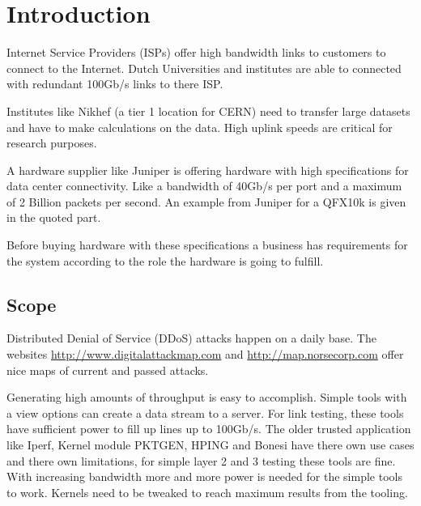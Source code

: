 \chapter{Introduction}\label{ch:intro}
Internet Service Providers (ISPs) offer high bandwidth links to customers to connect to the Internet. Dutch Universities and institutes are able to connected with redundant 100Gb/s links to there ISP.

Institutes like Nikhef (a tier 1 location for CERN) need to transfer large datasets and have to make calculations on the data. High uplink speeds are critical for research purposes.

A hardware supplier like Juniper is offering hardware with high specifications for data center connectivity. Like a bandwidth of 40Gb/s per port and a maximum of 2 Billion packets per second. An example from Juniper for a QFX10k is given in the quoted part. 


Before buying hardware with these specifications a business has requirements for the system according to the role the hardware is going to fulfill.

\section{Scope}\label{sec:scope}
Distributed Denial of Service (DDoS) attacks happen on a daily base. The websites \url{http://www.digitalattackmap.com} and \url{http://map.norsecorp.com} offer nice maps of current and passed attacks. 


Generating high amounts of throughput is easy to accomplish. Simple tools with a view options can create a data stream to a server. For link testing, these tools have sufficient power to fill up lines up to 100Gb/s. 
The older trusted application like Iperf, Kernel module PKTGEN, HPING and Bonesi have there own use cases and there own limitations, for simple layer 2 and 3 testing these tools are fine.
With increasing bandwidth more and more power is needed for the simple tools to work. Kernels need to be tweaked to reach maximum results from the tooling. 

